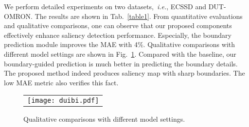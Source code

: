 \documentclass[journal]{IEEEtran}
\begin{document}
We perform detailed experiments on two datasets,~\emph{i.e.}, ECSSD and DUT-OMRON.
The results are shown in Tab.~\ref{table1}.
From quantitative evaluations and qualitative comparisons, one can observe that our proposed components effectively enhance saliency detection performance.
Especially, the boundary prediction module improves the MAE with 4\%.
Qualitative comparisons with different model settings are shown in Fig.~\ref{Fig_com}.
Compared with the baseline, our boundary-guided prediction is much better in predicting the boundary details.
The proposed method indeed produces saliency map with sharp boundaries. The low MAE metric also verifies this fact.
\begin{figure}[!t]
\begin{center}
\begin{tabular}{@{}c}
\texttt{[image: duibi.pdf]}
\end{tabular}
{\caption{Qualitative comparisons with different model settings.}
\label{Fig_com}}
\vspace{-6mm}
\end{center}
\end{figure}
\begin{table}[thp]
\vspace{-2mm}
\begin{center}
\caption{Quantitative comparison of different settings. The best results are in bold. The VGG-16\cite{simonyan2014very} version is AFFM$^{+}\bullet$.}
\label{table1}
\vspace{-5mm}
\end{center}
\end{table}
\end{document}
